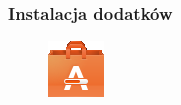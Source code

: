 \subsubsection{Instalacja dodatków}
\begin{figure}
	\vspace{-10pt}
	\includegraphics[width=\linewidth]{images/pierwsze_uruchomienie_dodatki1.png}
\end{figure}

